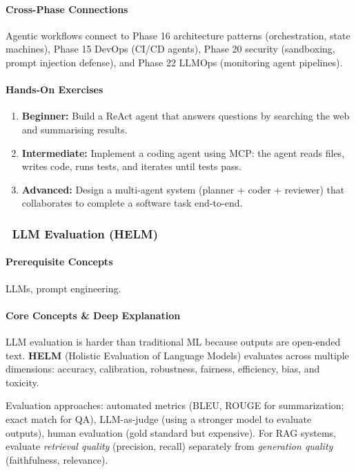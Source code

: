 \documentclass[11pt, a4paper, oneside]{report}
\newcommand{\mustmaster}[1]{\subsubsection{\texorpdfstring{\fcolorbox{blue!40!black}{blue!8}{\footnotesize\bfseries\color{blue!40!black} MUST MASTER}~#1}{#1}}}
\begin{document}
\paragraph{Cross-Phase Connections} Agentic workflows connect to Phase 16 architecture patterns (orchestration, state machines), Phase 15 DevOps (CI/CD agents), Phase 20 security (sandboxing, prompt injection defense), and Phase 22 LLMOps (monitoring agent pipelines).

\paragraph{Hands-On Exercises}
\begin{enumerate}[leftmargin=*]
\item \textbf{Beginner:} Build a ReAct agent that answers questions by searching the web and summarising results.
\item \textbf{Intermediate:} Implement a coding agent using MCP: the agent reads files, writes code, runs tests, and iterates until tests pass.
\item \textbf{Advanced:} Design a multi-agent system (planner + coder + reviewer) that collaborates to complete a software task end-to-end.
\end{enumerate}


\mustmaster{LLM Evaluation (HELM)}

\paragraph{Prerequisite Concepts} LLMs, prompt engineering.

\paragraph{Core Concepts \& Deep Explanation} LLM evaluation is harder than traditional ML because outputs are open-ended text. \textbf{HELM} (Holistic Evaluation of Language Models) evaluates across multiple dimensions: accuracy, calibration, robustness, fairness, efficiency, bias, and toxicity.

Evaluation approaches: automated metrics (BLEU, ROUGE for summarization; exact match for QA), LLM-as-judge (using a stronger model to evaluate outputs), human evaluation (gold standard but expensive). For RAG systems, evaluate \emph{retrieval quality} (precision, recall) separately from \emph{generation quality} (faithfulness, relevance).
\end{document}
